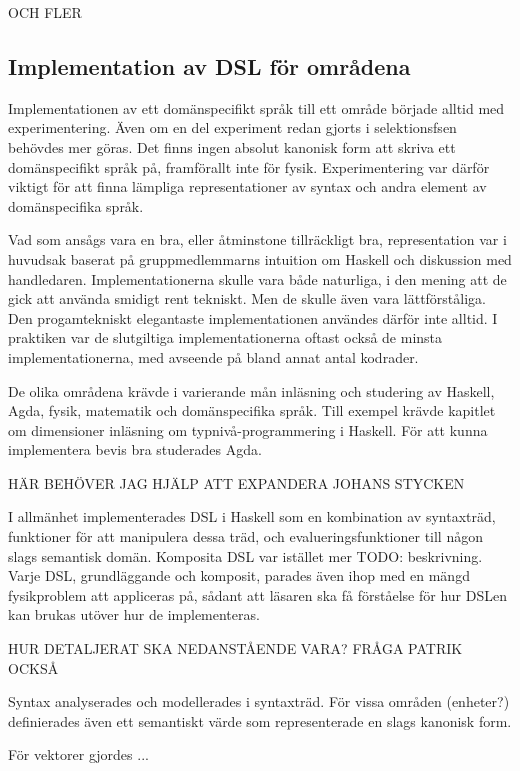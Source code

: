 \begin{binge}
OCH FLER

\subsection{Implementation av DSL för områdena}

Implementationen av ett domänspecifikt språk till ett område började alltid med experimentering. Även om en del experiment redan gjorts i selektionsfsen behövdes mer göras. Det finns ingen absolut kanonisk form att skriva ett domänspecifikt språk på, framförallt inte för fysik. Experimentering var därför viktigt för att finna lämpliga representationer av syntax och andra element av domänspecifika språk.

Vad som ansågs vara en bra, eller åtminstone tillräckligt bra, representation var i huvudsak baserat på gruppmedlemmarns intuition om Haskell och diskussion med handledaren. Implementationerna skulle vara både naturliga, i den mening att de gick att använda smidigt rent tekniskt. Men de skulle även vara lättförståliga. Den progamtekniskt elegantaste implementationen användes därför inte alltid. I praktiken var de slutgiltiga implementationerna oftast också de minsta implementationerna, med avseende på bland annat antal kodrader.

De olika områdena krävde i varierande mån inläsning och studering av Haskell, Agda, fysik, matematik och domänspecifika språk. Till exempel krävde kapitlet om dimensioner inläsning om typnivå-programmering i Haskell. För att kunna implementera bevis bra studerades Agda.

HÄR BEHÖVER JAG HJÄLP ATT EXPANDERA JOHANS STYCKEN

I allmänhet implementerades DSL i Haskell som en kombination av
syntaxträd, funktioner för att manipulera dessa träd, och
evalueringsfunktioner till någon slags semantisk domän. Komposita
DSL var istället mer TODO: beskrivning. Varje DSL, grundläggande och
komposit, parades även ihop med en mängd fysikproblem att appliceras
på, sådant att läsaren ska få förståelse för hur DSLen kan brukas
utöver hur de implementeras.

HUR DETALJERAT SKA NEDANSTÅENDE VARA? FRÅGA PATRIK OCKSÅ

Syntax analyserades och modellerades i syntaxträd. För vissa områden
(enheter?) definierades även ett semantiskt värde som representerade
en slags kanonisk form.

För vektorer gjordes ...


\end{binge}
